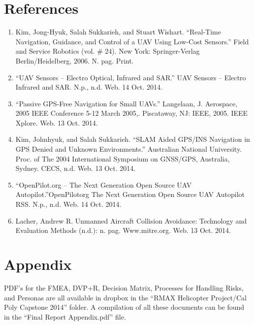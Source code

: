 \documentclass[12pt]{article}
\begin{document}
\section{References}
\begin{enumerate}
\item Kim, Jong-Hyuk, Salah Sukkarieh, and Stuart Wishart. ``Real-Time Navigation, Guidance, and Control of a UAV Using Low-Cost Sensors.'' Field and Service Robotics (vol. \# 24). New York: Springer-Verlag Berlin/Heidelberg, 2006. N. pag. Print.
\item ``UAV Sensors -- Electro Optical, Infrared and SAR.'' UAV Sensors -- Electro Infrared and SAR. N.p., n.d. Web. 14 Oct. 2014.
\item ``Passive GPS-Free Navigation for Small UAVs.'' Langelaan, J. Aerospace, 2005 IEEE Conference 5-12 March 2005,. Piscataway, NJ: IEEE, 2005. IEEE Xplore. Web. 13 Oct. 2014.
\item Kim, Johnhyuk, and Salah Sukkarieh. ``SLAM Aided GPS/INS Navigation in GPS Denied and Unknown Environments.'' Australian National University. Proc. of The 2004 International Symposium on GNSS/GPS, Australia, Sydney. CECS, n.d. Web. 13 Oct. 2014.
\item ``OpenPilot.org -- The Next Generation Open Source UAV Autopilot.''OpenPilotorg The Next Generation Open Source UAV Autopilot RSS. N.p., n.d. Web. 14 Oct. 2014.
\item Lacher, Andrew R. Unmanned Aircraft Collision Avoidance: Technology and Evaluation Methods (n.d.): n. pag. Www.mitre.org. Web. 13 Oct. 2014.
\end{enumerate}

\section{Appendix}
PDF's for the FMEA, DVP+R, Decision Matrix, Processes for Handling Risks, and Personas are all available in dropbox in the ``RMAX Helicopter Project/Cal Poly Capstone 2014'' folder. A compilation of all these documents can be found in the ``Final Report Appendix.pdf'' file.
\end{document}
